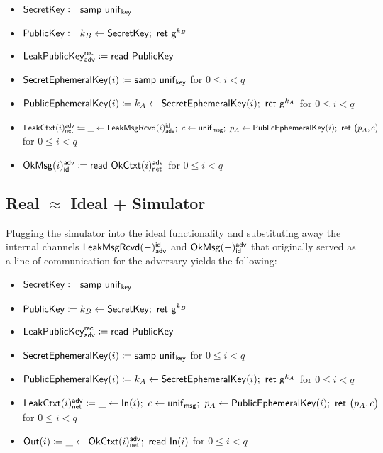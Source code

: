 \begin{itemize}
\item $\mathsf{SecretKey} \coloneqq \mathsf{samp} \ \mathsf{unif}_{\mathsf{key}}$
\item $\mathsf{PublicKey} \coloneqq k_B \leftarrow \mathsf{SecretKey}; \ \mathsf{ret} \ \mathsf{g}^{k_B}$
\item $\mathsf{LeakPublicKey}^{\mathsf{rec}}_{\mathsf{adv}} \coloneqq \mathsf{read} \ \mathsf{PublicKey}$
\item $\mathsf{SecretEphemeralKey}(i) \coloneqq \mathsf{samp} \ \mathsf{unif}_{\mathsf{key}}$ for $0 \leq i < q$
\item $\mathsf{PublicEphemeralKey}(i) \coloneqq k_A \leftarrow \mathsf{SecretEphemeralKey}(i); \ \mathsf{ret} \ \mathsf{g}^{k_A}$ for $0 \leq i < q$
\item $\mathsf{LeakCtxt}(i)^{\mathsf{adv}}_{\mathsf{net}} \coloneqq \_ \leftarrow \mathsf{LeakMsgRcvd}(i)^{\mathsf{id}}_{\mathsf{adv}}; \ c \leftarrow \mathsf{unif}_{\mathsf{msg}}; \ p_A \leftarrow \mathsf{PublicEphemeralKey}(i); \ \mathsf{ret} \ \big(p_A, c\big)$ for $0 \leq i < q$
\item $\mathsf{OkMsg}(i)^{\mathsf{adv}}_{\mathsf{id}} \coloneqq \mathsf{read} \ \mathsf{OkCtxt}(i)^{\mathsf{adv}}_{\mathsf{net}}$ for $0 \leq i < q$
\end{itemize}

\subsection{Real \texorpdfstring{$\approx$}{Approximates} Ideal + Simulator}
Plugging the simulator into the ideal functionality and substituting away the internal channels $\mathsf{LeakMsgRcvd}(-)^{\mathsf{id}}_{\mathsf{adv}}$ and $\mathsf{OkMsg}(-)^{\mathsf{adv}}_{\mathsf{id}}$ that originally served as a line of communication for the adversary yields the following:

\begin{itemize}
\item $\mathsf{SecretKey} \coloneqq \mathsf{samp} \ \mathsf{unif}_{\mathsf{key}}$
\item $\mathsf{PublicKey} \coloneqq k_B \leftarrow \mathsf{SecretKey}; \ \mathsf{ret} \ \mathsf{g}^{k_B}$
\item $\mathsf{LeakPublicKey}^{\mathsf{rec}}_{\mathsf{adv}} \coloneqq \mathsf{read} \ \mathsf{PublicKey}$
\item $\mathsf{SecretEphemeralKey}(i) \coloneqq \mathsf{samp} \ \mathsf{unif}_{\mathsf{key}}$ for $0 \leq i < q$
\item $\mathsf{PublicEphemeralKey}(i) \coloneqq k_A \leftarrow \mathsf{SecretEphemeralKey}(i); \ \mathsf{ret} \ \mathsf{g}^{k_A}$ for $0 \leq i < q$
\item $\mathsf{LeakCtxt}(i)^{\mathsf{adv}}_{\mathsf{net}} \coloneqq \_ \leftarrow \mathsf{In}(i); \ c \leftarrow \mathsf{unif}_{\mathsf{msg}}; \ p_A \leftarrow \mathsf{PublicEphemeralKey}(i); \ \mathsf{ret} \ \big(p_A, c\big)$ for $0 \leq i < q$
\item $\mathsf{Out}(i) \coloneqq \_ \leftarrow \mathsf{OkCtxt}(i)^{\mathsf{adv}}_{\mathsf{net}}; \ \mathsf{read} \ \mathsf{In}(i)$ for $0 \leq i < q$
\end{itemize}

